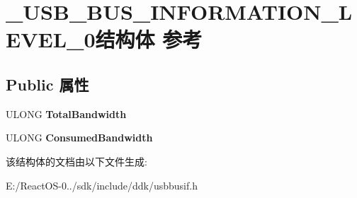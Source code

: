 \hypertarget{struct___u_s_b___b_u_s___i_n_f_o_r_m_a_t_i_o_n___l_e_v_e_l__0}{}\section{\+\_\+\+U\+S\+B\+\_\+\+B\+U\+S\+\_\+\+I\+N\+F\+O\+R\+M\+A\+T\+I\+O\+N\+\_\+\+L\+E\+V\+E\+L\+\_\+0结构体 参考}
\label{struct___u_s_b___b_u_s___i_n_f_o_r_m_a_t_i_o_n___l_e_v_e_l__0}
\subsection*{Public 属性}
\begin{DoxyCompactItemize}
\item 
\mbox{\label{struct___u_s_b___b_u_s___i_n_f_o_r_m_a_t_i_o_n___l_e_v_e_l__0_aa0409b571c6d4cd69d3c0edb06d2720f}} 
U\+L\+O\+NG {\bfseries Total\+Bandwidth}
\item 
\mbox{\label{struct___u_s_b___b_u_s___i_n_f_o_r_m_a_t_i_o_n___l_e_v_e_l__0_aa6c4f472a11a863011cd04dcc591b47e}} 
U\+L\+O\+NG {\bfseries Consumed\+Bandwidth}
\end{DoxyCompactItemize}


该结构体的文档由以下文件生成\+:\begin{DoxyCompactItemize}
\item 
E\+:/\+React\+O\+S-\/0../sdk/include/ddk/usbbusif.\+h\end{DoxyCompactItemize}
